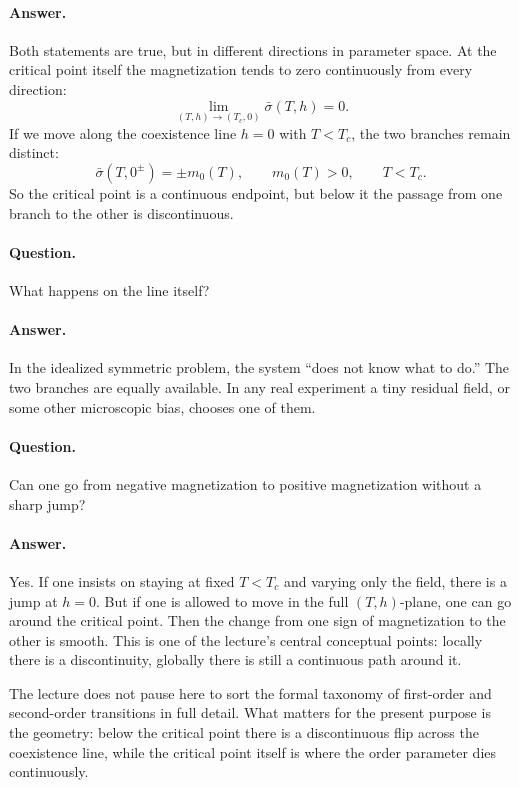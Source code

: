 \paragraph{Answer.} Both statements are true, but in different directions in parameter space. At the critical point itself the magnetization tends to zero continuously from every direction:
\begin{equation}
\lim_{(T,h)\to(T_c,0)} \bar{\sigma}(T,h)=0.
\end{equation}
If we move along the coexistence line \(h=0\) with \(T<T_c\), the two branches remain distinct:
\begin{equation}
\bar{\sigma}(T,0^\pm)=\pm m_0(T), \qquad m_0(T)>0,\qquad T<T_c.
\end{equation}
So the critical point is a continuous endpoint, but below it the passage from one branch to the other is discontinuous.

\paragraph{Question.} What happens on the line itself?

\paragraph{Answer.} In the idealized symmetric problem, the system ``does not know what to do.'' The two branches are equally available. In any real experiment a tiny residual field, or some other microscopic bias, chooses one of them.

\paragraph{Question.} Can one go from negative magnetization to positive magnetization without a sharp jump?

\paragraph{Answer.} Yes. If one insists on staying at fixed \(T<T_c\) and varying only the field, there is a jump at \(h=0\). But if one is allowed to move in the full \((T,h)\)-plane, one can go around the critical point. Then the change from one sign of magnetization to the other is smooth. This is one of the lecture's central conceptual points: locally there is a discontinuity, globally there is still a continuous path around it.

The lecture does not pause here to sort the formal taxonomy of first-order and second-order transitions in full detail. What matters for the present purpose is the geometry: below the critical point there is a discontinuous flip across the coexistence line, while the critical point itself is where the order parameter dies continuously.

